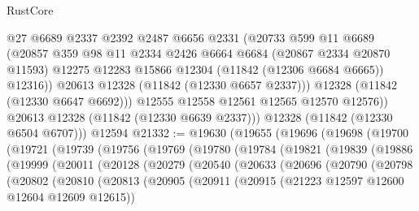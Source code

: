 \begin{lexlean}{RustCore}
\begin{coremodule}
                @27
                @6689
                @2337
                @2392
                @2487
                @6656
                @2331
                (@20733
                  @599
                  @11
                  @6689
                  (@20857
                    @359
                    @98
                    @11
                    @2334
                    @2426
                    @6664
                    @6684
                    (@20867 @2334 @20870 @11593)
                    @12275
                    @12283
                    @15866
                    @12304
                    (@11842 (@12306 @6684 @6665))
                    @12316))
                @20613
                @12328
                (@11842 (@12330 @6657 @2337)))
              @12328
              (@11842 (@12330 @6647 @6692)))
            @12555
            @12558
            @12561
            @12565
            @12570
            @12576))
        @20613
        @12328
        (@11842 (@12330 @6639 @2337)))
      @12328
      (@11842 (@12330 @6504 @6707)))
    @12594
@21332 := @19630
    (@19655
      (@19696
        (@19698
          (@19700
            (@19721
              (@19739
                (@19756
                  (@19769
                    (@19780
                      (@19784
                        (@19821
                          (@19839
                            (@19886
                              (@19999
                                (@20011
                                  (@20128
                                    (@20279
                                      (@20540
                                        (@20633
                                          (@20696
                                            (@20790
                                              (@20798
                                                (@20802
                                                  (@20810
                                                    (@20813
                                                      (@20905
                                                        (@20911
                                                          (@20915
                                                            (@21223
                                                              @12597
                                                              @12600
                                                              @12604
                                                              @12609
                                                              @12615))

\end{coremodule}
\end{lexlean}
